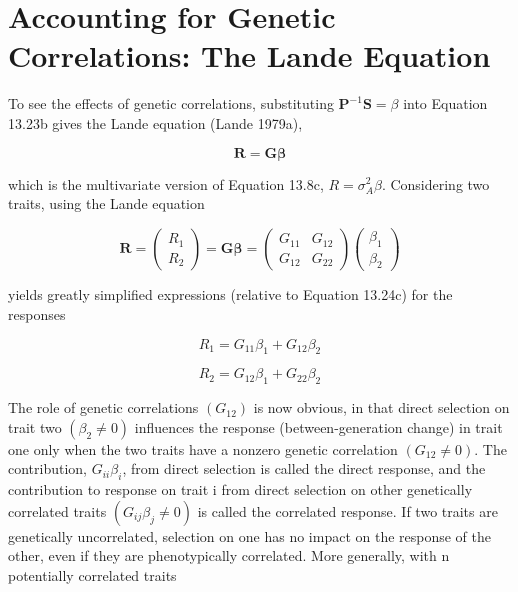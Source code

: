 \documentclass{article}
\begin{document}
\section{Accounting for Genetic Correlations: The Lande Equation}
To see the effects of genetic correlations, substituting  $ \mathbf{P}^{-1}\mathbf{S} = \beta $ into Equation 13.23b gives the Lande equation (Lande 1979a),

\begin{equation}
\mathbf{R}=\mathbf{G}\boldsymbol{\beta}
\tag{13.26a}
\label{eq:13_26a}
\end{equation}

which is the multivariate version of Equation 13.8c,  $ R = \sigma_A^2 \beta $. Considering two traits, using the Lande equation

\begin{equation}
\mathbf{R}=\begin{pmatrix}R_{1}\\ R_{2}\end{pmatrix}=\mathbf{G}\boldsymbol{\beta}=\begin{pmatrix}G_{11}&G_{12}\\ G_{12}&G_{22}\end{pmatrix}\begin{pmatrix}\beta_{1}\\ \beta_{2}\end{pmatrix}
\tag{13.26b}
\label{eq:13_26b}
\end{equation}

yields greatly simplified expressions (relative to Equation 13.24c) for the responses

\begin{equation}
R_{1}=G_{11}\beta_{1}+G_{12}\beta_{2}
\tag{13.26c}
\label{eq:13_26c}
\end{equation}

\begin{equation}
R_{2}=G_{12}\beta_{1}+G_{22}\beta_{2}
\end{equation}

The role of genetic correlations  $ (G_{12}) $ is now obvious, in that direct selection on trait two  $ (\beta_2 \neq 0) $ influences the response (between-generation change) in trait one only when the two traits have a nonzero genetic correlation  $ (G_{12} \neq 0) $. The contribution,  $ G_{ii}\beta_i $, from direct selection is called the direct response, and the contribution to response on trait i from direct selection on other genetically correlated traits  $ (G_{ij}\beta_j \neq 0) $ is called the correlated response. If two traits are genetically uncorrelated, selection on one has no impact on the response of the other, even if they are phenotypically correlated. More generally, with n potentially correlated traits
\end{document}
